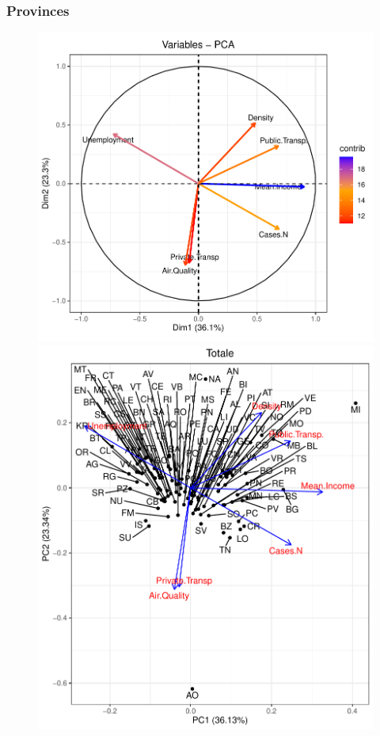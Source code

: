 \documentclass[compress]{beamer}
\begin{document}
\begin{frame}


\frametitle{Provinces}


\begin{figure}[H]
\centering
\begin{minipage}{.5\textwidth}
  \centering
  \includegraphics[width=\linewidth, ]{Pic/Province_FULL_Variables-PCA.pdf}
\end{minipage}%
\begin{minipage}{.5\textwidth}
  \centering
  \includegraphics[width=\linewidth,]{Pic/Provinces_PCA_FULL.pdf}
\end{minipage}
\end{figure}

\end{frame}
\end{document}
